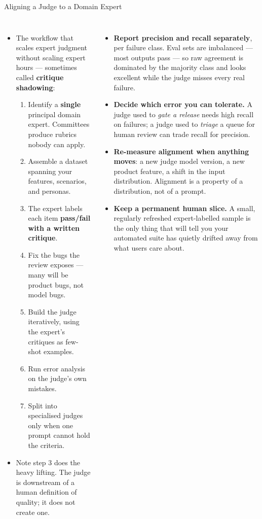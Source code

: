 \begin{frame}{Aligning a Judge to a Domain Expert}
  \begin{columns}[T,onlytextwidth]
      \begin{itemize}\scriptsize\itemsep0.05em
        \item[\textcolor{red}{$\blacktriangleright$}] The workflow that scales expert judgment without scaling expert hours --- sometimes called \textbf{critique shadowing}:
          \begin{enumerate}\itemsep0.05em
            \item Identify a \textbf{single} principal domain expert. Committees produce rubrics nobody can apply.
            \item Assemble a dataset spanning your features, scenarios, and personas.
            \item The expert labels each item \textbf{pass/fail with a written critique}.
            \item Fix the bugs the review exposes --- many will be product bugs, not model bugs.
            \item Build the judge iteratively, using the expert's critiques as few-shot examples.
            \item Run error analysis on the judge's own mistakes.
            \item Split into specialised judges only when one prompt cannot hold the criteria.
          \end{enumerate}
        \item[\textcolor{red}{$\blacktriangleright$}] Note step 3 does the heavy lifting. The judge is downstream of a human definition of quality; it does not create one.
      \end{itemize}
      \begin{itemize}\scriptsize\itemsep0.05em
        \item[\textcolor{red}{$\blacktriangleright$}] \textbf{Report precision and recall separately}, per failure class. Eval sets are imbalanced --- most outputs pass --- so raw agreement is dominated by the majority class and looks excellent while the judge misses every real failure.
        \item[\textcolor{red}{$\blacktriangleright$}] \textbf{Decide which error you can tolerate.} A judge used to \textit{gate a release} needs high recall on failures; a judge used to \textit{triage} a queue for human review can trade recall for precision.
        \item[\textcolor{red}{$\blacktriangleright$}] \textbf{Re-measure alignment when anything moves}: a new judge model version, a new product feature, a shift in the input distribution. Alignment is a property of a distribution, not of a prompt.
        \item[\textcolor{red}{$\blacktriangleright$}] \textbf{Keep a permanent human slice.} A small, regularly refreshed expert-labelled sample is the only thing that will tell you your automated suite has quietly drifted away from what users care about.
      \end{itemize}
  \end{columns}
\end{frame}

